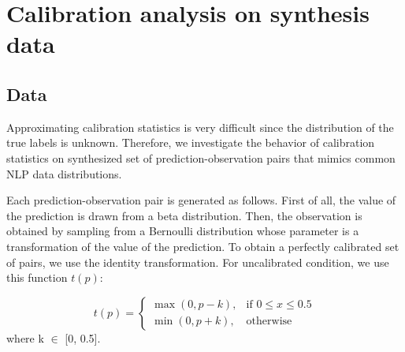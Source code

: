 \section{Calibration analysis on synthesis data}

\subsection{Data}

Approximating calibration statistics is very difficult since the distribution of the true labels is unknown. Therefore, we investigate the behavior of calibration statistics on synthesized set of prediction-observation pairs that mimics common NLP data distributions. 

Each prediction-observation pair is generated as follows. First of all, the value of the prediction is drawn from a beta distribution. Then, the observation is obtained by sampling from a Bernoulli distribution whose parameter is a transformation of the value of the prediction. To obtain a perfectly calibrated set of pairs, we use the identity transformation. For uncalibrated condition, we use this function $t(p)$:

\[
        t(p) =
\begin{cases}
  \max(0, p - k), & \text{if } 0 \leq x \leq 0.5 \\
  \min(0, p + k), & \text{otherwise}
\end{cases}
\]
where k $\in$ [0, 0.5].

